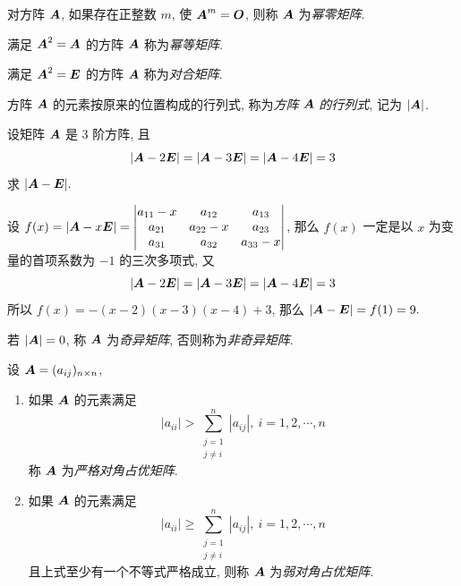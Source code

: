 \begin{definition}[幂零矩阵]
    对方阵 $ \vb*{A} $, 如果存在正整数 $ m $, 使 $ \vb*{A}^{m}=\vb*{O} $, 则称 $ \vb*{A} $ 为\textit{幂零矩阵}.
\end{definition}

\begin{definition}[幂等矩阵]
    满足 $ \vb*{A}^{2}=\vb*{A} $ 的方阵 $ \vb*{A} $ 称为\textit{幂等矩阵}.
\end{definition}

\begin{definition}[对合矩阵]
    满足 $ \vb*{A}^{2}=\vb*{E} $ 的方阵 $ \vb*{A} $ 称为\textit{对合矩阵}.
\end{definition}

\begin{definition}[方阵的行列式]
    方阵 $ \vb*{A} $ 的元素按原来的位置构成的行列式, 称为\textit{方阵} $ \vb*{A} $ \textit{的行列式}, 记为 $ |\vb*{A}| $.
\end{definition}

\begin{example}
    设矩阵 $\vb*{A}$ 是 3 阶方阵, 且 $$|\vb*{A}-2\vb*{E}|=|\vb*{A}-3\vb*{E}|=|\vb*{A}-4\vb*{E}|=3$$
    求 $|\vb*{A}-\vb*{E}|.$
\end{example}
\begin{solution}
    设 $f(x)=|\vb*{A}-x\vb*{E}|=\mqty|a_{11}-x&a_{12}&a_{13}\\a_{21}&a_{22}-x&a_{23}\\a_{31}&a_{32}&a_{33}-x|$, 那么 $f(x)$ 一定是以 $x$ 为变量的首项系数为 $-1$ 的三次多项式, 又
    $$|\vb*{A}-2\vb*{E}|=|\vb*{A}-3\vb*{E}|=|\vb*{A}-4\vb*{E}|=3$$
    所以 $f(x)=-(x-2)(x-3)(x-4)+3$, 那么 $|\vb*{A}-\vb*{E}|=f(1)=9.$
\end{solution}

\begin{definition}[奇异矩阵与非奇异矩阵]
    若 $ |\vb*{A}|=0 $, 称 $ \vb*{A} $ 为\textit{奇异矩阵}, 否则称为\textit{非奇异矩阵}.
\end{definition}

\begin{definition}[对角占优矩阵]
    设 $\vb*{A}=(a_{ij})_{n\times n}$, 
    \begin{enumerate}[label=(\arabic{*})]
        \item 如果 $\vb*{A}$ 的元素满足 $$
        |a_{ii}|>\sum_{\substack{j=1\\ j\neq i}}^{n} |a_{ij}|,~i=1, 2, \cdots ,n
        $$
        称 $\vb*{A}$ 为\textit{严格对角占优矩阵}.
        \item 如果 $\vb*{A}$ 的元素满足 $$
        |a_{ii}|\geqslant\sum_{\substack{j=1\\ j\neq i}}^{n} |a_{ij}|,~i=1, 2, \cdots ,n
        $$
        且上式至少有一个不等式严格成立, 则称 $\vb*{A}$ 为\textit{弱对角占优矩阵}.
    \end{enumerate}
\end{definition}

